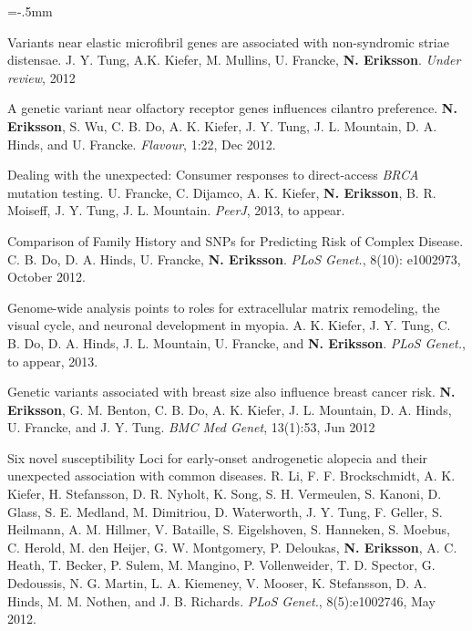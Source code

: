 \documentclass[11pt]{article}
\newenvironment{papers}[1][1]
	{\vspace{-2ex}\leftmargini=16.1mm%
	 \begin{revnumerate}[{#1}]\itemsep=-.5mm}
	{\end{revnumerate}\vspace{-2ex}}
\def\paper{\item}
\def\paperyear#1{\item[\addtocounter{enumi}{-1}%
		 {\makebox[0mm][r]{\makebox[14mm]{#1\hfill\arabic{enumi}.}}}]}
\newcounter{separated}%
\begin{document}
\begin{papers}[25]%

 
                \paperyear{\makebox[5.5ex][r]{submitted\,\,}}
        Variants near elastic microfibril genes are associated with non-syndromic striae distensae.
        J. Y. Tung, A.K. Kiefer, M. Mullins, U. Francke, \textbf{N. Eriksson}.
        \textit{Under review}, 2012

     
                \paperyear{2012}
        A genetic variant near olfactory receptor genes influences cilantro preference.
        \textbf{N. Eriksson}, S. Wu, C. B. Do, A. K. Kiefer, J. Y. Tung, J. L.  Mountain, D. A. Hinds, and U. Francke.
        \textit{Flavour}, 1:22, Dec 2012.

            \paper
        Dealing with the unexpected: Consumer responses to direct-access \textit{BRCA} mutation testing.
        U. Francke, C. Dijamco, A. K. Kiefer, \textbf{N. Eriksson}, B. R. Moiseff, J. Y. Tung, J. L. Mountain.
        \textit{PeerJ}, 2013, to appear.

            \paper
        Comparison of Family History and SNPs for Predicting Risk of Complex Disease.
        C. B. Do, D. A. Hinds, U. Francke, \textbf{N. Eriksson}.
        \textit{PLoS Genet.}, 8(10): e1002973, October 2012.

            \paper
        Genome-wide analysis points to roles for extracellular matrix remodeling, the visual cycle, and neuronal development in myopia.
        A. K. Kiefer, J. Y. Tung, C. B. Do, D. A. Hinds, J. L. Mountain, U. Francke, and \textbf{N. Eriksson}.
        \textit{PLoS Genet.}, to appear, 2013.

            \paper
        Genetic variants associated with breast size also influence breast cancer risk.
        \textbf{N. Eriksson}, G. M. Benton, C. B. Do, A. K. Kiefer, J. L. Mountain, D. A. Hinds, U. Francke, and J. Y. Tung.
        \textit{BMC Med Genet}, 13(1):53, Jun 2012

            \paper
        Six novel susceptibility Loci for early-onset androgenetic alopecia and their unexpected association with common diseases.
        R. Li, F. F. Brockschmidt, A. K. Kiefer, H. Stefansson, D. R. Nyholt, K. Song, S. H. Vermeulen, S. Kanoni, D. Glass, S. E. Medland, M. Dimitriou, D. Waterworth, J. Y. Tung, F. Geller, S. Heilmann, A. M. Hillmer, V. Bataille, S. Eigelshoven, S. Hanneken, S. Moebus, C. Herold, M. den Heijer, G. W. Montgomery, P. Deloukas, \textbf{N. Eriksson}, A. C. Heath, T. Becker, P. Sulem, M. Mangino, P. Vollenweider, T. D. Spector, G. Dedoussis, N. G.  Martin, L. A. Kiemeney, V. Mooser, K. Stefansson, D. A. Hinds, M. M. Nothen, and J. B. Richards.
        \textit{PLoS Genet.}, 8(5):e1002746, May 2012.


\end{papers}
\end{document}
